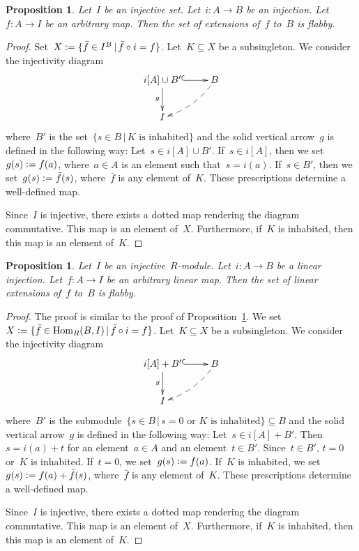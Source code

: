 \documentclass[oneside]{amsart}
\theoremstyle{definition}
\theoremstyle{plain}
\newtheorem{prop}[defn]{Proposition}
\theoremstyle{remark}
\newcommand{\defeq}{\vcentcolon=}
\DeclareMathOperator{\Hom}{Hom}
\renewcommand{\_}{\mathpunct{.}\,}
\begin{document}
\begin{prop}\label{prop:set-of-extensions-flabby}
Let~$I$ be an injective set. Let~$i : A \to B$ be an injection.
Let~$f : A \to I$ be an arbitrary map. Then the set of extensions of~$f$ to~$B$
is flabby.\end{prop}

\begin{proof}Set~$X \defeq \{ \bar{f} \in I^B \,|\, \bar{f} \circ i =
f \}$. Let~$K \subseteq X$ be a subsingleton. We consider the injectivity diagram
\[ \xymatrix{
  i[A] \cup B' \ar@{^{(}->}[r]\ar[d]_g & B \ar@{-->}@/^/[ld] \\
  I
} \]
where~$B'$ is the set~$\{ s \in B \,|\, \text{$K$ is inhabited} \}$ and the solid
vertical arrow~$g$ is defined in the following way: Let~$s \in i[A] \cup B'$.
If~$s \in i[A]$, then we set~$g(s) \defeq f(a)$, where~$a \in A$ is an element such
that~$s = i(a)$. If~$s \in B'$, then we set~$g(s) \defeq \bar{f}(s)$,
where~$\bar{f}$ is any element of~$K$. These prescriptions determine a well-defined
map.

Since~$I$ is injective, there exists a dotted map rendering the diagram
commutative. This map is an element of~$X$. Furthermore, if~$K$ is inhabited,
then this map is an element of~$K$.
\end{proof}

\begin{prop}\label{prop:set-of-linear-extensions-flabby}
Let~$I$ be an injective~$R$-module. Let~$i : A \to B$ be a linear injection.
Let~$f : A \to I$ be an arbitrary linear map. Then the set of linear extensions of~$f$ to~$B$
is flabby.\end{prop}

\begin{proof}The proof is similar to the proof of
Proposition~\ref{prop:set-of-extensions-flabby}. We
set~$X \defeq \{ \bar{f} \in \Hom_R(B,I) \,|\, \bar{f} \circ i =
f \}$. Let~$K \subseteq X$ be a subsingleton. We consider the injectivity diagram
\[ \xymatrix{
  i[A] + B' \ar@{^{(}->}[r]\ar[d]_g & B \ar@{-->}@/^/[ld] \\
  I
} \]
where~$B'$ is the submodule~$\{ s \in B \,|\, \text{$s = 0$ or $K$ is
inhabited} \} \subseteq B$ and the solid vertical arrow~$g$ is defined in the following
way: Let~$s \in i[A] + B'$. Then~$s = i(a) + t$ for an element~$a \in A$ and an
element~$t \in B'$. Since~$t \in B'$, $t = 0$ or~$K$ is inhabited. If~$t = 0$,
we set~$g(s) \defeq f(a)$. If~$K$ is inhabited, we set~$g(s) \defeq f(a) +
\bar{f}(s)$, where~$\bar{f}$ is any element of~$K$. These prescriptions
determine a well-defined map.

Since~$I$ is injective, there exists a dotted map rendering the diagram
commutative. This map is an element of~$X$. Furthermore, if~$K$ is inhabited,
then this map is an element of~$K$.
\end{proof}
\end{document}

